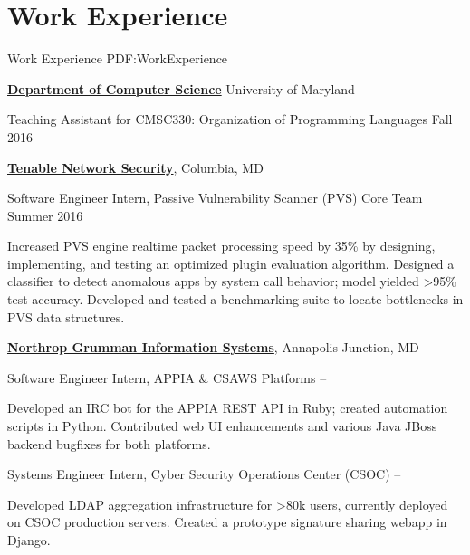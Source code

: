 
\section
{Work Experience}
{Work Experience}
{PDF:WorkExperience}

\href{https://cs.umd.edu/}
{\textbf{Department of Computer Science}}
University of Maryland
\hfill

\GapNoBreak
\hspace{1em} Teaching Assistant for CMSC330: Organization of Programming Languages
\hfill
Fall 2016

\GapNoBreak
\href{https://www.tenable.com/}
{\textbf{Tenable Network Security}},
Columbia, MD

\GapNoBreak
\hspace{1em} Software Engineer Intern, Passive Vulnerability Scanner (PVS) Core Team
\hfill
Summer 2016
\begin{detail}
\SubBulletItem
Increased PVS engine realtime packet processing speed by 35\% by designing, implementing, and testing an optimized plugin evaluation algorithm.
\SubBulletItem
Designed a classifier to detect anomalous apps by system call behavior; model yielded >95\% test accuracy.
\SubBulletItem
Developed and tested a benchmarking suite to locate bottlenecks in PVS data structures.
\end{detail}

\Gap
\href{https://www.ngc.com/}
{\textbf{Northrop Grumman Information Systems}},
Annapolis Junction, MD

\GapNoBreak
\hspace{1em} 
Software Engineer Intern, APPIA \& CSAWS Platforms
\hfill
{} --
\begin{detail}
\SubBulletItem
Developed an IRC bot for the APPIA REST API in Ruby; created automation scripts in Python.
\SubBulletItem
Contributed web UI enhancements and various Java JBoss backend bugfixes for both platforms.
\end{detail}

\GapNoBreak
\hspace{1em} 
Systems Engineer Intern, Cyber Security Operations Center (CSOC)
\hfill
{} --
\begin{detail}
\SubBulletItem
Developed LDAP aggregation infrastructure for >80k users, currently deployed on CSOC production servers.
\SubBulletItem
Created a prototype signature sharing webapp in Django.
\end{detail}
